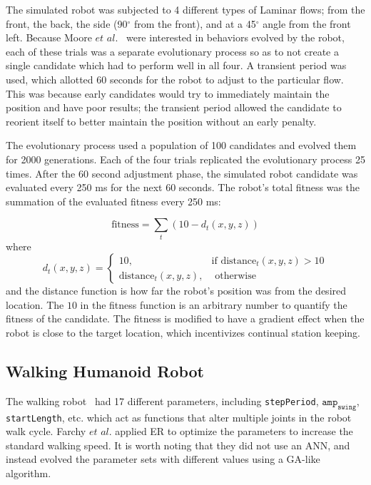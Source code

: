 \documentclass{sig-alternate}
\begin{document}
 The simulated robot was subjected to 4 different types of Laminar flows; from the front, the back, the side (90$^\circ$ from the front), and at a 45$^\circ$ angle from the front left. Because Moore $et$ $al.$~\cite{Moore:2013:ESK:2463372.2463402} were interested in behaviors evolved by the robot, each of these trials was a separate evolutionary process so as to not create a single candidate which had to perform well in all four. A transient period was used, which allotted 60 seconds for the robot to adjust to the particular flow. This was because early candidates would try to immediately maintain the position and have poor results; the transient period allowed the candidate to reorient itself to better maintain the position without an early penalty. 
 
 The evolutionary process used a population of 100 candidates and evolved them for 2000 generations. Each of the four trials replicated the evolutionary process 25 times. After the 60 second adjustment phase, the simulated robot candidate was evaluated every 250 ms for the next 60 seconds. The robot's total fitness was the summation of the evaluated fitness every 250 ms:

\begin{equation*}
	\textrm{fitness} = \sum_{t} (10 - d_t(x, y, z))
\end{equation*}
where
\[
	d_t(x, y, z) = 
		\begin{cases} 10, & \textrm{if distance}_t(x, y, z) > 10 \\
					  \textrm{distance}_t(x, y, z), & \textrm{ otherwise}
		\end{cases}
\] and the distance function is how far the robot's position was from the desired location. The $10$ in the fitness function is an arbitrary number to quantify the fitness of the candidate. The fitness is modified to have a gradient effect when the robot is close to the target location, which incentivizes continual station keeping.  
 
  \subsection{Walking Humanoid Robot}\label{Farchy Evolving}
  The walking robot~\cite{Farchy:2013:HRL:2484920.2484930} had 17 different parameters, including \texttt{stepPeriod}, $\texttt{amp}_\texttt{swing}$, \texttt{startLength}, etc. which act as functions that alter multiple joints in the robot walk cycle. Farchy $et$ $al.$ applied ER to optimize the parameters to increase the standard walking speed. It is worth noting that they did not use an ANN, and instead evolved the parameter sets with different values using a GA-like algorithm.
 
\end{document}
